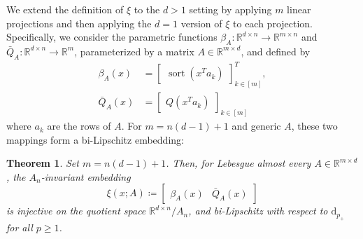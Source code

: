 \documentclass{amsart}
\theoremstyle{plain}
\newtheorem{theorem}{Theorem}
\theoremstyle{definition}
\theoremstyle{remark}
\DeclareMathOperator{\sort}{sort}
\newcommand{\RR}{\mathbb{R}}
\newcommand{\dap}[1]{\mathrm{d}_{#1_+}}
\begin{document}
We extend the definition of $\xi$ to the  $d > 1$ setting by applying  $m$ linear projections and then applying the $d=1$ version of $\xi$ to each projection. Specifically, we consider the parametric functions $\beta_A: \RR^{d \times n} \to \RR^{m \times n}$ and $\bar{Q}_A: \RR^{d \times n} \to \RR^{m}$, parameterized by a matrix $A \in \RR^{m \times d}$, and defined by
\begin{equation} \label{def:betaQ}
\begin{split}
\beta_A(x) &= \begin{bmatrix}
\sort{\left(x^T a_k \right)}
\end{bmatrix}^T_{k \in [m]}, \\
\bar{Q}_A(x) &= \begin{bmatrix}
Q\left(x^T a_k \right)
\end{bmatrix}_{k \in [m]}
\end{split}
\end{equation}
where $a_k$ are the rows of $A$. For $m=n(d-1)+1$ and generic $A$, these two mappings form a bi-Lipschitz embedding:
\begin{theorem} \label{thm:bl1}
    Set $m = n(d-1) + 1$. Then, for Lebesgue almost every $A \in \RR^{m \times d}$, the $A_n$-invariant embedding
    \begin{equation} \label{eq:xi}
    \xi(x ; A) \coloneq \begin{bmatrix}
    \beta_A(x) & \bar{Q}_A(x)
\end{bmatrix}
    \end{equation}
is injective on the quotient space $\RR^{d \times n} / A_n$, and bi-Lipschitz with respect to $\dap{p}$ for all $p\geq 1$.
\end{theorem}
\end{document}
